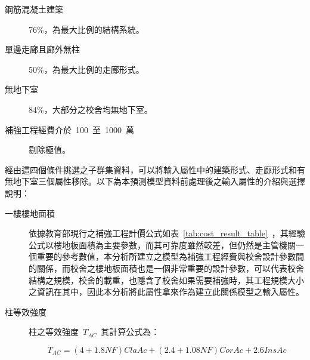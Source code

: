 \begin{description}
\item [鋼筋混凝土建築] 76\%，為最大比例的結構系統。
\item [單邊走廊且廊外無柱] 50\%，為最大比例的走廊形式。
\item [無地下室] 84\%，大部分之校舍均無地下室。
\item [補強工程經費介於~100~至~1000~萬] 剔除極值。
\end{description}


經由這四個條件挑選之子群集資料，可以將輸入屬性中的建築形式、走廊形式和有無地下室三個屬性移除。以下為本預測模型資料前處理後之輸入屬性的介紹與選擇說明：

\begin{description}
  \item[一樓樓地面積]
  依據教育部現行之補強工程計價公式如表~\ref{tab:cost_result_table}~，其經驗公式以樓地板面積為主要參數，而其可靠度雖然較差，但仍然是主管機關一個重要的參考數值，本分析所建立之模型為補強工程經費與校舍設計參數間的關係，而校舍之樓地板面積也是一個非常重要的設計參數，可以代表校舍結構之規模，校舍的載重，也隱含了校舍如果需要補強時，其工程規模大小之資訊在其中，因此本分析將此屬性拿來作為建立此關係模型之輸入屬性。
  \item[柱等效強度]
  柱之等效強度~$T_{AC}$~其計算公式為：

  \begin{equation}T_{AC} = (4+1.8NF)ClaAc+(2.4+1.08NF)CorAc+2.6InsAc\end{equation} 


\end{description}
